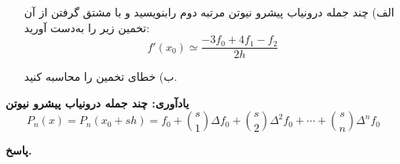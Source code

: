 \begin{enumerate}
	\item[الف)] چند جمله درونیاب پیشرو نیوتن مرتبه دوم  رابنویسید و با مشتق گرفتن از آن تخمین زیر را به‌دست آورید:
	\[f'(x_0) \simeq \frac{-3f_0 + 4f_1 -f_2}{2h}\]
 		\vspace*{-.3cm}
	\item[ب)] 
	خطای تخمین را محاسبه کنید.
\end{enumerate}
\textbf{یادآوری: چند جمله درونیاب پیشرو نیوتن }
\[P_n(x) = P_n(x_0+sh) = f_0 + {s \choose 1} \Delta f_0 + {s \choose 2} \Delta^2 f_0 + \cdots + {s \choose n} \Delta^n f_0 \]
\vspace*{-.3cm}
\begin{answer}
	
	\textbf{پاسخ.}
	
\end{answer}